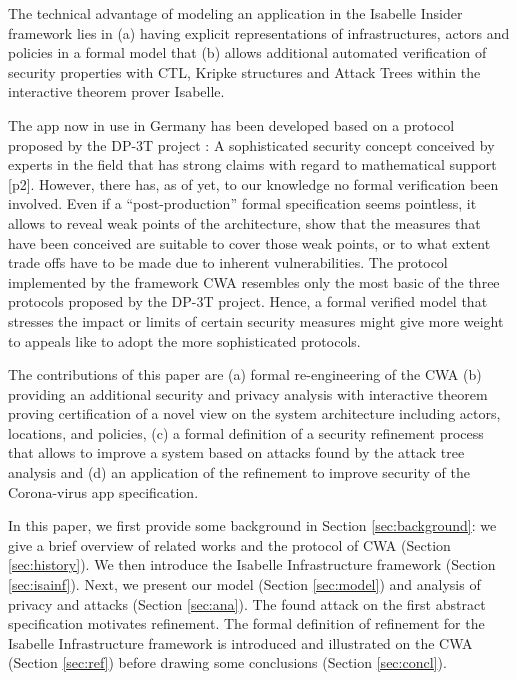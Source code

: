 \documentclass{llncs}
\begin{document}
The technical advantage of modeling an application in the Isabelle Insider framework lies
in (a) having explicit representations of infrastructures, actors and policies in a
formal model that (b) allows additional automated verification of security properties
with CTL, Kripke structures and Attack Trees within the interactive theorem prover
Isabelle.

The app now in use in Germany has been developed based on a protocol proposed by the DP-3T project \cite{dp3t:github}:
A sophisticated security concept
conceived by experts in the field that has strong claims with regard to mathematical support \cite{dp3t:wp} [p2].
%
However, there has, as of yet, to our knowledge no formal verification been involved.
Even if a ``post-production'' formal specification seems pointless, 
it allows to reveal weak points of the architecture, show that the measures that have
been conceived are suitable to cover those weak points,
or to what extent trade offs have to be made due to inherent vulnerabilities.
The protocol implemented by the framework CWA resembles only the most basic
of the three protocols proposed by the DP-3T project.
Hence, a formal verified model that stresses the impact or limits of certain security measures
might give more weight to appeals like \cite{dp3t:impl}
to adopt the more sophisticated protocols.

The contributions of this paper are (a) formal re-engineering of the CWA
(b) providing an additional security and privacy analysis with interactive theorem proving
certification of a novel view on the system architecture including actors, locations, and policies,
(c) a formal definition of a security refinement process that allows to improve a system
based on attacks found by the attack tree analysis and (d) an application of the refinement to
improve security of the Corona-virus app specification.

In this paper, we first provide some background in Section \ref{sec:background}:
we give a brief overview of related works
and the protocol of CWA (Section \ref{sec:history}).
We then introduce the Isabelle Infrastructure framework (Section \ref{sec:isainf}).
Next, we present our model (Section \ref{sec:model}) and analysis of privacy and
attacks (Section \ref{sec:ana}). The found attack on the first abstract specification
motivates refinement. The formal definition of refinement for the Isabelle Infrastructure
framework is introduced and illustrated on the CWA (Section \ref{sec:ref})
before drawing some conclusions (Section \ref{sec:concl}).
\end{document}
